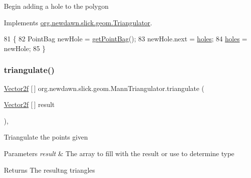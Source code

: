 Begin adding a hole to the polygon 

Implements \mbox{\hyperlink{interfaceorg_1_1newdawn_1_1slick_1_1geom_1_1_triangulator_a0636d620daef98eab2ceb5bcf9dfaa9d}{org.\+newdawn.\+slick.\+geom.\+Triangulator}}.


\begin{DoxyCode}
81                             \{
82         PointBag newHole = \mbox{\hyperlink{classorg_1_1newdawn_1_1slick_1_1geom_1_1_mann_triangulator_abff661e95ea77ddb64a185bd989ee933}{getPointBag}}();
83         newHole.next = \mbox{\hyperlink{classorg_1_1newdawn_1_1slick_1_1geom_1_1_mann_triangulator_a52a9b8b72ebce44c620dbad2e8285540}{holes}};
84         \mbox{\hyperlink{classorg_1_1newdawn_1_1slick_1_1geom_1_1_mann_triangulator_a52a9b8b72ebce44c620dbad2e8285540}{holes}} = newHole;
85     \}
\end{DoxyCode}
\mbox{\label{classorg_1_1newdawn_1_1slick_1_1geom_1_1_mann_triangulator_ada6f608c2da6bec3253fb33f443e2f59}} 
\subsubsection{\texorpdfstring{triangulate()}{triangulate()}\hspace{0.1cm}{\footnotesize\ttfamily [1/2]}}
{\footnotesize\ttfamily \mbox{\hyperlink{classorg_1_1newdawn_1_1slick_1_1geom_1_1_vector2f}{Vector2f}} \mbox{[}$\,$\mbox{]} org.\+newdawn.\+slick.\+geom.\+Mann\+Triangulator.\+triangulate (\begin{DoxyParamCaption}\item[{\mbox{\hyperlink{classorg_1_1newdawn_1_1slick_1_1geom_1_1_vector2f}{Vector2f}} \mbox{[}$\,$\mbox{]}}]{result }\end{DoxyParamCaption})\hspace{0.3cm}{\ttfamily [inline]}, {\ttfamily [private]}}

Triangulate the points given


\begin{DoxyParams}{Parameters}
{\em result} & The array to fill with the result or use to determine type \\
\hline
\end{DoxyParams}
\begin{DoxyReturn}{Returns}
The resultng triangles 
\end{DoxyReturn}

